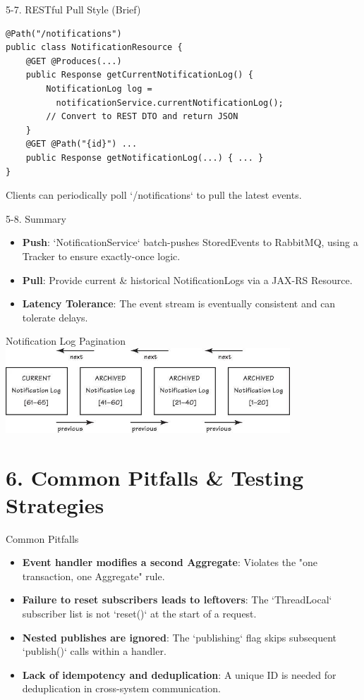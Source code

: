 \documentclass{beamer}
\begin{document}
\begin{frame}[fragile]{5-7. RESTful Pull Style (Brief)}
  \lstset{language=Java, basicstyle=\ttfamily\scriptsize}
  \begin{lstlisting}
@Path("/notifications")
public class NotificationResource {
    @GET @Produces(...)
    public Response getCurrentNotificationLog() {
        NotificationLog log =
          notificationService.currentNotificationLog();
        // Convert to REST DTO and return JSON
    }
    @GET @Path("{id}") ...
    public Response getNotificationLog(...) { ... }
}
  \end{lstlisting}
  Clients can periodically poll `/notifications` to pull the latest events.
\end{frame}

\begin{frame}{5-8. Summary}
  \begin{itemize}
    \item \textbf{Push}: `NotificationService` batch-pushes StoredEvents to RabbitMQ, using a Tracker to ensure exactly-once logic.
    \item \textbf{Pull}: Provide current \& historical NotificationLogs via a JAX-RS Resource.
    \item \textbf{Latency Tolerance}: The event stream is eventually consistent and can tolerate delays.
  \end{itemize}
\end{frame}

\begin{frame}{Notification Log Pagination}
  \includegraphics[width=0.8\textwidth]{img/DomainEvent_NotificationLog_Pagination.png}
\end{frame}


\section{6. Common Pitfalls \& Testing Strategies}

\begin{frame}{Common Pitfalls}
  \begin{itemize}
    \item \textbf{Event handler modifies a second Aggregate}: Violates the "one transaction, one Aggregate" rule.
    \item \textbf{Failure to reset subscribers leads to leftovers}: The `ThreadLocal` subscriber list is not `reset()` at the start of a request.
    \item \textbf{Nested publishes are ignored}: The `publishing` flag skips subsequent `publish()` calls within a handler.
    \item \textbf{Lack of idempotency and deduplication}: A unique ID is needed for deduplication in cross-system communication.
  \end{itemize}
\end{frame}
\end{document}
